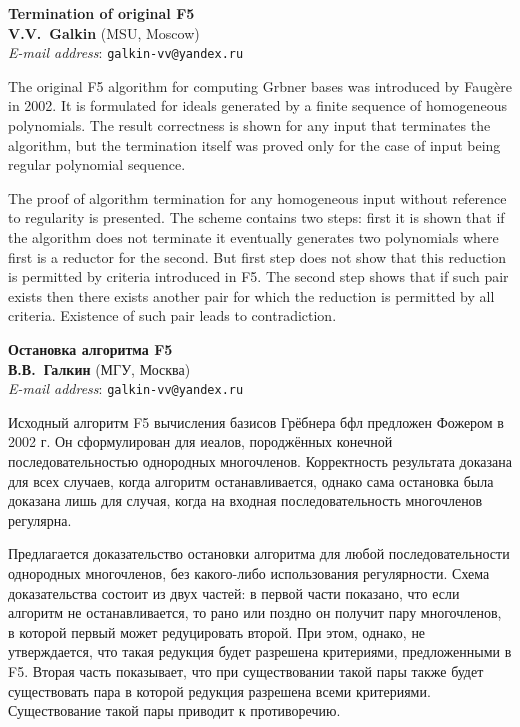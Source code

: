 \documentclass[A4, 12pt, twoside]{article}
\begin{document}
\begin{center} \textbf{
	Termination of original F5 \\[.3cm]
	V.V.~Galkin}  (MSU, Moscow) \\
	\emph{E-mail address}: \texttt{galkin-vv@yandex.ru}\\[.3cm]
\end{center}
\normalsize

The original F5 algorithm for computing Grbner bases was introduced by Faug\`{e}re in 2002.
It is formulated for ideals generated by a finite sequence of homogeneous polynomials.
The result correctness is shown for any input that terminates the algorithm,
but the termination itself was proved only for the case of input being regular polynomial sequence.

The proof of algorithm termination for any homogeneous input without reference to regularity is presented.
The scheme contains two steps: first it is shown that if the algorithm does not
terminate it eventually generates two polynomials where first is a
reductor for the second. But first step does not show that this reduction
is permitted by criteria introduced in F5. The second step shows that
if such pair exists then there exists another pair for which the reduction
is permitted by all criteria. Existence of such pair leads to contradiction.




\begin{center} \textbf{
	Остановка алгоритма F5 \\[.3cm]
	В.В.~Галкин}  (МГУ, Москва) \\
	\emph{E-mail address}: \texttt{galkin-vv@yandex.ru}\\[.3cm]
\end{center}
\normalsize
Исходный алгоритм F5 вычисления базисов Грёбнера бфл предложен Фожером в 2002 г.
Он сформулирован для иеалов, породжённых конечной последовательностью однородных многочленов.
Корректность результата доказана для всех случаев, когда алгоритм останавливается,
однако сама остановка была доказана лишь для случая, когда на входная последовательность многочленов регулярна.

Предлагается доказательство остановки алгоритма для любой последовательности однородных многочленов, без какого-либо использования регулярности.
Схема доказательства состоит из двух частей: в первой части показано, что если алгоритм
не останавливается, то рано или поздно он получит пару многочленов,
в которой первый может редуцировать второй. При этом, однако, не утверждается,
что такая редукция будет разрешена критериями, предложенными в F5.
Вторая часть показывает, что при существовании такой пары также будет
существовать пара в которой редукция разрешена всеми критериями. Существование
такой пары приводит к противоречию.
\end{document}

